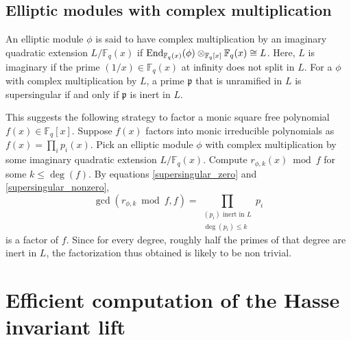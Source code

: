 \documentclass[12pt]{article}
\theoremstyle{plain}
\theoremstyle{definition}
\DeclareMathOperator{\End}{{\rm End}} %
\def\F{\ensuremath{\mathbb{F}}}
\newcommand{\p}{\mathfrak p}
\begin{document}
\subsection{Elliptic modules with complex multiplication}
\label{randomized_section}

An elliptic module $\phi$ is said to have complex multiplication by an imaginary quadratic 
extension $L/\F_q(x)$ if $\End_{\F_q(x)}(\phi)\otimes_{\F_q[x]} \F_q(x) \cong L$. Here, $L$ is 
imaginary if the prime $(1/x) \in \F_q(x)$ at infinity does not split in $L$. For a $\phi$ with 
complex multiplication by $L$, a prime $\p$ that is unramified in $L$ is supersingular if and
only if $\p$ is inert in $L$.

This suggests the following strategy to factor a monic square free polynomial $f(x) \in \F_q[x]$. 
Suppose $f(x)$ factors into monic irreducible polynomials as $f(x) = \prod_i p_i(x)$. Pick an 
elliptic module $\phi$ with complex multiplication by some imaginary quadratic extension 
$L/\F_q(x)$. Compute $r_{\phi,k}(x) \bmod f$ for some $k \le \deg(f)$. By equations 
\eqref{supersingular_zero} and \eqref{supersingular_nonzero}, 
\[\gcd(r_{\phi,k} \bmod f, f) = \prod_{\substack{(p_i) \text{ inert in } L \\ \deg(p_i) \le k}} 
p_i \]
is a factor of $f$. Since for every degree, roughly half the primes of that degree are inert in 
$L$, the factorization thus obtained is likely to be non trivial.


 
 

\section{Efficient computation of the Hasse invariant lift}
\label{sec:hasse}
\end{document}

